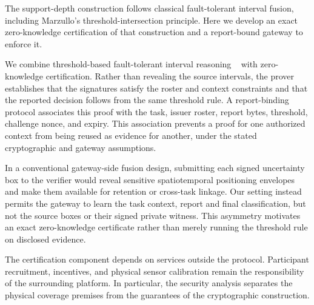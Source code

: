 \documentclass[pdflatex,iicol,sn-mathphys-num]{sn-jnl}
\theoremstyle{thmstyleone}
\begin{document}
The support-depth construction follows classical fault-tolerant interval fusion, including Marzullo's threshold-intersection principle. Here we develop an exact zero-knowledge certification of that construction and a report-bound gateway to enforce it.

We combine threshold-based fault-tolerant interval reasoning ~\citep{Marzullo1990,BFTPoLoc,PG,CRSF} with zero-knowledge certification. Rather than revealing the source intervals, the prover establishes that the signatures satisfy the roster and context constraints and that the reported decision follows from the same threshold rule. A report-binding protocol associates this proof with the task, issuer roster, report bytes, threshold, challenge nonce, and expiry. This association prevents a proof for one authorized context from being reused as evidence for another, under the stated cryptographic and gateway assumptions.

In a conventional gateway-side fusion design, submitting each signed uncertainty box to the verifier would reveal sensitive spatiotemporal positioning envelopes and make them available for retention or cross-task linkage. Our setting instead permits the gateway to learn the task context, report and final classification, but not the source boxes or their signed private witness. This asymmetry motivates an exact zero-knowledge certificate rather than merely running the threshold rule on disclosed evidence.

The certification component depends on services outside the protocol. Participant recruitment, incentives, and physical sensor calibration remain the responsibility of the surrounding platform. In particular, the security analysis separates the physical coverage premises from the guarantees of the cryptographic construction.
\end{document}

